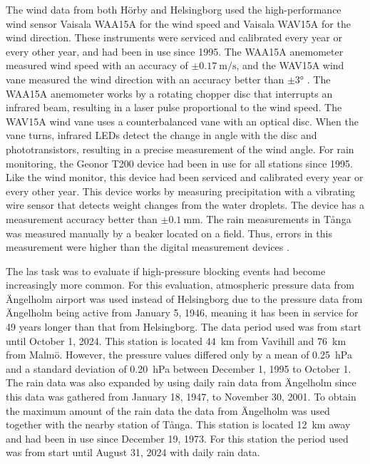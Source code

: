 The wind data from both Hörby and Helsingborg used the high-performance wind sensor Vaisala WAA15A for the wind speed and Vaisala WAV15A for the wind direction. These instruments were serviced and calibrated every year or every other year, and had been in use since 1995. The WAA15A anemometer measured wind speed with an accuracy of $\pm\SI{0.17}{\m\per\s}$, and the WAV15A wind vane measured the wind direction with an accuracy better than $\pm\ang{3}$ \cite{vaisalaWindSetWA152021}. The WAA15A anemometer works by a rotating chopper disc that interrupts an infrared beam, resulting in a laser pulse proportional to the wind speed. The WAV15A wind vane uses a counterbalanced vane with an optical disc. When the vane turns, infrared LEDs detect the change in angle with the disc and phototransistors, resulting in a precise measurement of the wind angle. For rain monitoring, the Geonor T200 device had been in use for all stations since 1995. Like the wind monitor, this device had been serviced and calibrated every year or every other year. This device works by measuring precipitation with a vibrating wire sensor that detects weight changes from the water droplets\cite{geonorinc.T200BSeriesAll2019}. The device has a measurement accuracy better than $\pm\SI{0.1}{\mm}$. The rain measurements in Tånga was measured manually by a beaker located on a field. Thus, errors in this measurement were higher than the digital measurement devices . 

The las task was to evaluate if high-pressure blocking events had become increasingly more common. For this evaluation, atmospheric pressure data from Ängelholm airport was used instead of Helsingborg due to the pressure data from Ängelholm being active from January 5, 1946, meaning it has been in service for 49 years longer than that from Helsingborg. The data period used was from start until October 1, 2024. This station is located \SI{44}{\km} from Vavihill and \SI{76}{\km} from Malmö. However, the pressure values differed only by a mean of \SI{0.25}{\hecto\pascal} and a standard deviation of \SI{0.20}{\hecto\pascal} between December 1, 1995 to October 1. The rain data was also expanded by using daily rain data from Ängelholm since this data was gathered from January 18, 1947, to November 30, 2001. To obtain the maximum amount of the rain data the data from Ängelholm was used together with the nearby station of Tånga. This station is located \SI{12}{\km} away and had been in use since December 19, 1973. For this station the period used was from start until August 31, 2024 with daily rain data.  

